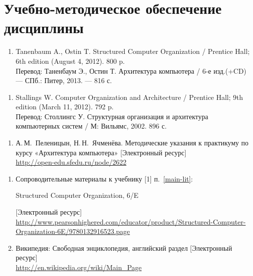 \section{Учебно-методическое обеспечение дисциплины}

	\label{main-lit}

\begin{enumerate}
	\item Tanenbaum A., Ostin T. Structured Computer Organization / Prentice Hall; 6th edition (August 4, 2012). 800 p.\\
	Перевод: Таненбаум Э., Остин Т. Архитектура компьютера / 6-е изд.(+CD) — СПб.: Питер, 2013. — 816 с.
\end{enumerate}

\begin{enumerate}
	\item Stallings W. Computer Organization and Architecture /  Prentice Hall; 9th edition (March 11, 2012). 792 p.\\
	Перевод: Столлингс У. Структурная организация и архитектура компьютерных систем / М: Вильямс, 2002. 896 с.
\end{enumerate}

	\label{author-res}
\begin{enumerate}
	\item А.\,М.~Пеленицын, Н.\,Н.~Ячменёва. Методические указания к практикуму по курсу «Архитектура компьютера» [Электронный ресурс]\\
	\url{http://open-edu.sfedu.ru/node/2622}
\end{enumerate}

	\label{online-res}
\begin{enumerate}
	\item Сопроводительные материалы к учебнику [1] п.~\ref{main-lit}:
	\begin{otherlanguage}{english}
	Structured Computer Organization, 6/E
	\end{otherlanguage}
	[Электронный ресурс]\\
	\url{http://www.pearsonhighered.com/educator/product/Structured-Computer-Organization-6E/9780132916523.page}

	\item Википедия: Свободная энциклопедия, английский раздел [Электронный ресурс]\\
	\url{http://en.wikipedia.org/wiki/Main_Page}
\end{enumerate}

